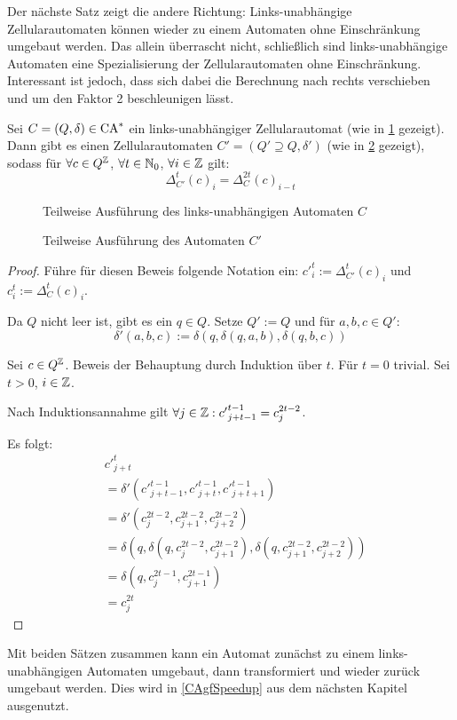 Der nächste Satz zeigt die andere Richtung: Links-unabhängige Zellularautomaten können
wieder zu einem Automaten ohne Einschränkung umgebaut werden. Das allein überrascht nicht, schließlich
sind links-unabhängige Automaten eine Spezialisierung der Zellularautomaten ohne Einschränkung.
Interessant ist jedoch, dass sich dabei die Berechnung nach rechts verschieben und um den Faktor 2 beschleunigen lässt.
\begin{satz}
    \label{linksunabhaengigZuZellauto}
    Sei $C = (Q, \delta) \in \textrm{CA}^*$ ein links-unabhängiger Zellularautomat (wie in \cref{fig:LinksunabhZuNormal1} gezeigt).
    Dann gibt es einen Zellularautomaten $C' = (Q' \supseteq Q, \delta')$ (wie in \cref{fig:LinksunabhZuNormal2} gezeigt),
    sodass für $\forall c \in Q^{\mathbb{Z}}$, $\forall t \in \mathbb{N}_0$, $\forall i \in \mathbb{Z}$ gilt:
    \[
        \Delta^t_{C'}(c)_{i} = \Delta^{2t}_C(c)_{i-t}
    \]
    
    \begin{figure}[!ht]
        \centering
        
        \caption{Teilweise Ausführung des links-unabhängigen Automaten $C$}
        \label{fig:LinksunabhZuNormal1}
    \end{figure}
   \begin{figure}[!ht]
        \centering
        
        \caption{Teilweise Ausführung des Automaten $C'$}
        \label{fig:LinksunabhZuNormal2}
    \end{figure}

\end{satz}
\begin{proof}
    Führe für diesen Beweis folgende Notation ein: ${c'}^{t}_i := \Delta^{t}_{C'}(c)_i$ und $c^t_i := \Delta^{t}_{C}(c)_i$.
    
    Da $Q$ nicht leer ist, gibt es ein $q \in Q$.
    Setze $Q' := Q$ und für $a, b, c \in Q'$:
    \[
        \delta'(a, b, c) := \delta(q, \delta(q, a, b), \delta(q, b, c))
    \]
    
    Sei $c \in Q^{\mathbb{Z}}$. Beweis der Behauptung durch Induktion über $t$. Für $t = 0$ trivial. Sei $t > 0$, $i \in \mathbb{Z}$.

    Nach Induktionsannahme gilt $\forall j \in \mathbb{Z}: {c'}^{t-1}_{j+t-1} = c^{2t-2}_j$.
    
    Es folgt:
    \begin{align*}
        & {c'}^{t}_{j+t} \\
        &= \delta'({c'}^{t-1}_{j+t-1}, {c'}^{t-1}_{j+t}, {c'}^{t-1}_{j+t+1}) \\
        &= \delta'(c^{2t-2}_{j}, c^{2t-2}_{j+1}, c^{2t-2}_{j+2}) \\
        &= \delta(q, \delta(q, c^{2t-2}_{j}, c^{2t-2}_{j+1}), \delta(q, c^{2t-2}_{j+1}, c^{2t-2}_{j+2})) \\
        &= \delta(q, c^{2t-1}_j, c^{2t-1}_{j+1} ) \\
        &= c^{2t}_j 
    \end{align*}
\end{proof}

Mit beiden Sätzen zusammen kann ein Automat zunächst zu einem links-unabhängigen Automaten umgebaut,
dann transformiert und wieder zurück umgebaut werden. Dies wird in \cref{CAgfSpeedup} aus dem nächsten Kapitel ausgenutzt.